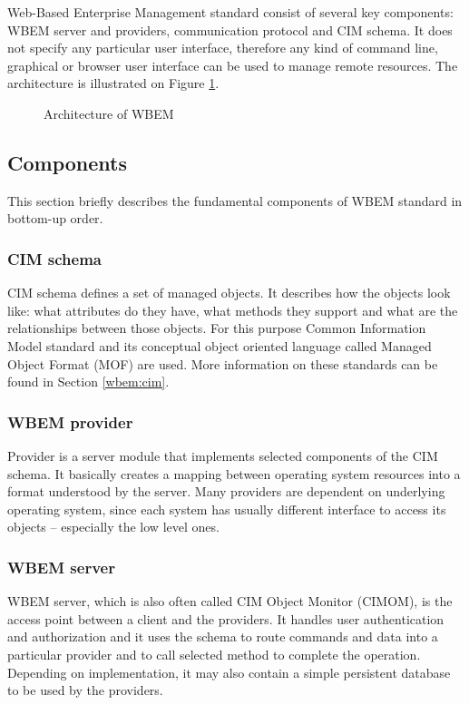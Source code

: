 Web-Based Enterprise Management standard consist of several key components:
WBEM server and providers, communication protocol and CIM schema. It does not
specify any particular user interface, therefore any kind of command line,
graphical or browser user interface can be used to manage remote resources. The
architecture is illustrated on Figure \ref{fig:wbem-arch}.

\begin{figure}[H]
  \centering
  
  \caption{Architecture of WBEM}
  \label{fig:wbem-arch}
\end{figure}

\subsection{Components}

This section briefly describes the fundamental components of WBEM standard
in bottom-up order.

\subsubsection{CIM schema}

CIM schema defines a set of managed objects. It describes how the objects look
like: what attributes do they have, what methods they support and what are the
relationships between those objects. For this purpose Common Information Model
standard and its conceptual object oriented language called Managed Object
Format (MOF) are used. More information on these standards can be found in
Section \ref{wbem:cim}.

\subsubsection{WBEM provider}

Provider is a server module that implements selected components of the CIM
schema. It basically creates a mapping between operating system resources into a
format understood by the server. Many providers are dependent on underlying
operating system, since each system has usually different interface to access
its objects -- especially the low level ones.

\subsubsection{WBEM server}

WBEM server, which is also often called CIM Object Monitor (CIMOM), is the
access point between a client and the providers. It handles user authentication
and authorization and it uses the schema to route commands and data into a
particular provider and to call selected method to complete the operation.
Depending on implementation, it may also contain a simple persistent database to
be used by the providers.

